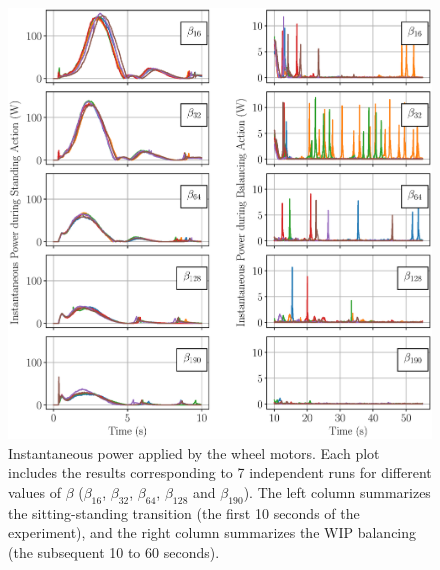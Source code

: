 \documentclass[letterpaper, 10 pt, conference]{ieeeconf}  %
\begin{document}
\begin{figure}[h]
\centering
\includegraphics[width = 0.99\columnwidth]{figs/dualColumn.eps}
\vspace{-1.5\baselineskip}
\caption{\label{fig:betas_comparison} Instantaneous power applied by the wheel motors.  Each plot includes the results corresponding to 7 independent runs for different values of $\beta$ ($\beta_{16}$, $\beta_{32}$, $\beta_{64}$, $\beta_{128}$ and $\beta_{190}$). The left column summarizes the sitting-standing transition (the first 10 seconds of the experiment), and the right column summarizes the \ac{WIP} balancing (the subsequent 10 to 60 seconds).}
\end{figure}
\end{document}
